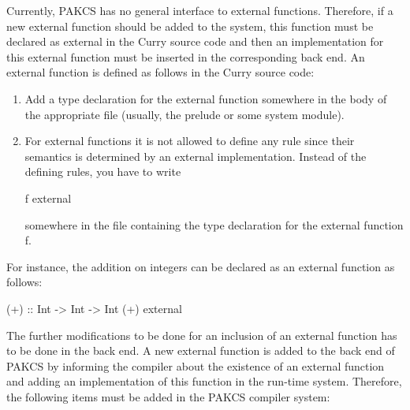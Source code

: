 \documentclass[11pt,fleqn]{article}
\renewcommand{\tt}{\usefont{OT1}{cmtt}{m}{n}\selectfont}
\newcommand{\codefont}{\small\tt}
\newcommand{\code}[1]{\mbox{\codefont #1}}
\newcommand{\CYS}{PAKCS\xspace} %
\begin{document}
Currently, \CYS has no general interface to external functions.
Therefore, if a new external function should be added
to the system, this function must be declared as \code{external}
in the Curry source code
and then an implementation for this external function
must be inserted in the corresponding back end.
An external function is defined as follows in the Curry source code:
\begin{enumerate}
\item
Add a type declaration for the external function somewhere
in the body of the appropriate file (usually, the prelude
or some system module).
\item
For external functions it is not allowed to define any
rule since their semantics is determined by an external implementation.
Instead of the defining rules, you have to write
\begin{curry}
f external
\end{curry}
somewhere in the file containing the type declaration for 
the external function \code{f}.
\end{enumerate}
For instance, the addition on integers can be declared as
an external function as follows:
\begin{curry}
(+) :: Int -> Int -> Int
(+) external
\end{curry}
The further modifications to be done for an inclusion of
an external function has to be done in the back end.
A new external function is added to the back end of \CYS
by informing the compiler about the existence of an external function
and adding an implementation of this function in the run-time
system. Therefore, the following items must be added
in the \CYS compiler system:
\end{document}
